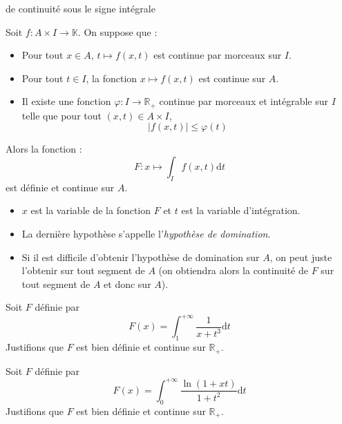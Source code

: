 \documentclass[french,11pt,twoside]{VcCours}
\newcommand{\dt}{\text{d}t}
\begin{document}
\begin{Theoreme}{de continuité sous le signe intégrale}

Soit $f : A \times I \rightarrow \mathbb{K}$. On suppose que :
\begin{itemize}
\item Pour tout $x \in A$, $t \mapsto f(x,t)$ est continue par morceaux sur $I$.
\item Pour tout $t \in I$, la fonction $x \mapsto f(x,t)$ est continue sur $A$.
\item Il existe une fonction $\varphi : I \rightarrow \mathbb{R}_+$ continue par morceaux et intégrable sur $I$ telle que pour tout $(x,t) \in A \times I$,
$$ \vert f(x,t) \vert \leq \varphi(t)$$
\end{itemize}
Alors la fonction :
$$ F : x \mapsto \int_{I} f(x,t) \dt$$
est définie et continue sur $A$.
\end{Theoreme}


\begin{Remarques}{}
\begin{itemize}
\item $x$ est la variable de la fonction $F$ et $t$ est la variable d'intégration.
\item La dernière hypothèse s'appelle l'\emph{hypothèse de domination}.
\item Si il est difficile d'obtenir l'hypothèse de domination sur $A$, on peut juste l'obtenir sur tout segment de $A$ (on obtiendra alors la continuité de $F$ sur tout segment de $A$ et donc sur $A$).
\end{itemize}
\end{Remarques}{}

\medskip

\begin{Exemple} Soit $F$ définie par 
$$ F(x) = \int_{1}^{+ \infty} \frac{1}{x+t^3} \dt$$
Justifions que $F$ est bien définie et continue sur $\mathbb{R}_+$.

\newpage

\end{Exemple}

\begin{Exemple} Soit $F$ définie par 
$$ F(x) = \int_{0}^{+ \infty} \frac{\ln(1+xt)}{1+t^2} \dt$$
Justifions que $F$ est bien définie et continue sur $\mathbb{R}_+$.

\vspace*{10cm}
\end{Exemple}
\end{document}
